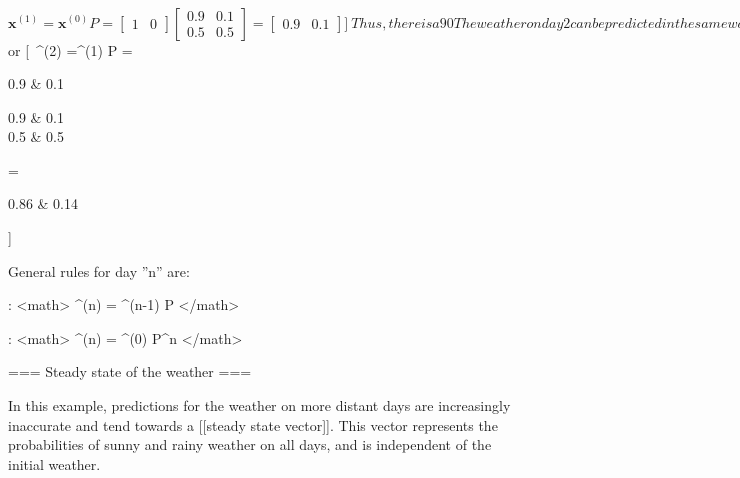 \[
    \mathbf{x}^{(1)} = \mathbf{x}^{(0)} P  = 
    \begin{bmatrix}
        1 & 0
    \end{bmatrix}
    \begin{bmatrix}
        0.9 & 0.1 \\
        0.5 & 0.5
    \end{bmatrix}
    
    = \begin{bmatrix}
        0.9 & 0.1
    \end{bmatrix} 
]\

Thus, there is a 90%

The weather on day 2 can be predicted in the same way:

[\
    \mathbf{x}^{(2)} =\mathbf{x}^{(1)} P  = \mathbf{x}^{(0)} P^2 
    = \begin{bmatrix}
        1 & 0
    \end{bmatrix}
    \begin{bmatrix}
        0.9 & 0.1 \\
        0.5 & 0.5
    \end{bmatrix}^2
    
    = \begin{bmatrix}
        0.86 & 0.14
    \end{bmatrix} 
\]
or
[\
    ^{(2)} =^{(1)} P 
    = \begin{bmatrix}
        0.9 & 0.1
    \end{bmatrix}
    \begin{bmatrix}
        0.9 & 0.1 \\
        0.5 & 0.5
    \end{bmatrix}
    
    = \begin{bmatrix}
        0.86 & 0.14
    \end{bmatrix} 
]\


General rules for day ''n'' are:

: <math>
    ^{(n)} = ^{(n-1)} P 
</math>

: <math>
    ^{(n)} = ^{(0)} P^n 
</math>

=== Steady state of the weather ===

In this example, predictions for the weather on more distant days are increasingly
inaccurate and tend towards a [[steady state vector]].  This vector represents
the probabilities of sunny and rainy weather on all days, and is independent
of the initial weather.

